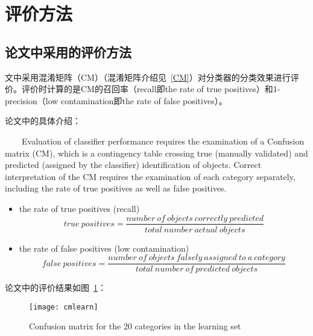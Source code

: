 \section{评价方法}

\subsection{论文中采用的评价方法}
文中采用{\color{blue}混淆矩阵（CM）}（混淆矩阵介绍见~\ref{CM}）对分类器的分类效果进行评价。评价时计算的是CM的召回率（recall即the rate of true positives）和1-precision（low contamination即the rate of false positives）。

论文中的具体介绍：
\begin{tcolorbox}[colback=red!5,colframe=blue!75!black]
~~~~Evaluation of classifier performance requires the examination of a {\color{blue}Confusion matrix (CM)}, which is a contingency table crossing true (manually validated) and predicted (assigned by the classifier) identification of objects. Correct interpretation of the CM requires the examination of each category separately, including {\color{blue}the rate of true positives} as well as {\color{blue}false positives}.
\begin{itemize}
    \item the rate of true positives (recall)
        \begin{displaymath}
            true~positives=\frac{number~of~objects~correctly~predicted}{total~number~actual~objects}
        \end{displaymath}
    \item the rate of false positives (low contamination)
        \begin{displaymath}
            false~positives=\frac{number~of~objects~falsely~assigned~to~a~category}{total~number~of~predicted~objects}
        \end{displaymath}
\end{itemize}
\end{tcolorbox}

论文中的评价结果如图~\ref{fig:cmlearn}：
    \begin{figure}[!ht]
      \centering 
        \texttt{[image: cmlearn]}
        \caption{Confusion matrix for the 20 categories in the learning set}
        \label{fig:cmlearn}
    \end{figure}
    
